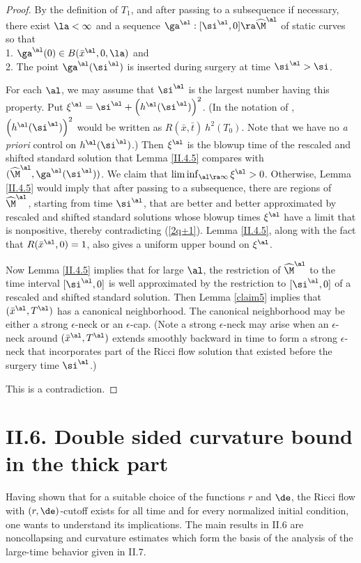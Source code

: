 \begin{proof}
By the definition of $T_1$, and after passing
to a subsequence if necessary, there exist $\la<\infty$ and a sequence
$\ga^\al:[\si^\al,0]\ra\widehat\M^\al$  of static curves so that  \\
1. $\ga^\al(0)\in B(\bar x^\al,0,\la)$ and \\
2. The point
$\ga^\al(\si^\al)$ is inserted during surgery at time $\si^\al>\si$.

For each $\al$, we may assume that $\si^\al$ is the largest number having
this property.
Put
$\xi^\al= \si^\al+\left( h^\al(\si^\al)\right)^2$.
(In the notation of \cite{Perelman2},
$\left( h^\al(\si^\al)\right)^2$ would be written
as $R(\bar x, \bar t) \: h^2(T_0)$. Note that we have no {\it a priori} control
on $h^\al(\si^\al)$.) Then $\xi^\al$
is the blowup time of the rescaled and shifted
standard solution that Lemma \ref{II.4.5}
compares with $(\widehat\M^\al,\ga^\al(\si^\al))$.  We claim
that $\liminf_{\al\ra\infty}\xi^\al>0$. Otherwise, Lemma
\ref{II.4.5} would imply that after passing to a subsequence,
there are regions of
$\widehat\M^\al$, starting from time $\si^\al$, that are better and better
approximated by rescaled and shifted standard solutions whose blowup times
$\xi^\al$ have a limit that is nonpositive,
thereby contradicting (\ref{2q+1}). Lemma \ref{II.4.5}, along with
the fact that $R({\bar x}^\al, 0) = 1$, also gives a uniform upper bound
on $\xi^\al$.

Now Lemma \ref{II.4.5} implies that for large $\al$,
the restriction of
$\widehat\M^\al$ to the time interval $[\si^\al,0]$ is well
approximated by the restriction to $[\si^\al,0]$
of a rescaled and shifted standard
solution. Then Lemma \ref{claim5} implies that $(\bar x^\al,T^\al)$
has a canonical neighborhood.
The canonical neighborhood may be either a strong $\epsilon$-neck
or an $\epsilon$-cap. (Note
a strong $\epsilon$-neck may arise when an
$\epsilon$-neck around
$(\bar x^\al,T^\al)$ extends smoothly backward in time to form
a strong $\epsilon$-neck that incorporates part of the Ricci flow
solution that existed before the surgery time $\si^\al$.)

This is a contradiction.
\end{proof}

\section{II.6. Double sided curvature bound in the thick part}
\label{II.6}

Having shown that for a suitable choice of the functions $r$ and $\de$,
the Ricci flow with $(r,\de)$-cutoff exists for all time and for every
normalized initial condition, one wants to understand
its implications.
The main results in II.6 are noncollapsing and curvature estimates
which form the basis of the analysis of the large-time behavior given
in II.7.

